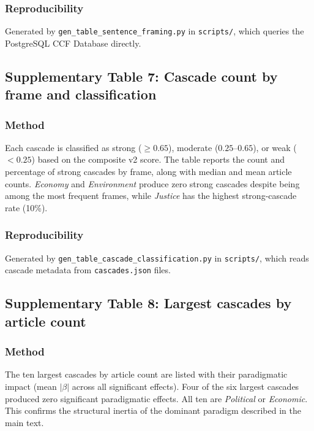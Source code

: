 \documentclass[11pt]{article}
\begin{document}
\subsubsection*{Reproducibility}
Generated by \texttt{gen\_table\_sentence\_framing.py} in \texttt{scripts/},
which queries the PostgreSQL CCF Database directly.


\newpage
\subsection*{Supplementary Table 7: Cascade count by frame and classification}



\subsubsection*{Method}
Each cascade is classified as strong ($\geq 0.65$), moderate ($0.25$--$0.65$), or weak ($< 0.25$) based on the composite v2 score. The table reports the count and percentage of strong cascades by frame, along with median and mean article counts. \emph{Economy} and \emph{Environment} produce zero strong cascades despite being among the most frequent frames, while \emph{Justice} has the highest strong-cascade rate (10\%).

\subsubsection*{Reproducibility}
Generated by \texttt{gen\_table\_cascade\_classification.py} in \texttt{scripts/},
which reads cascade metadata from \texttt{cascades.json} files.


\newpage
\subsection*{Supplementary Table 8: Largest cascades by article count}



\subsubsection*{Method}
The ten largest cascades by article count are listed with their paradigmatic impact (mean $|\beta|$ across all significant effects). Four of the six largest cascades produced zero significant paradigmatic effects. All ten are \emph{Political} or \emph{Economic}. This confirms the structural inertia of the dominant paradigm described in the main text.
\end{document}
